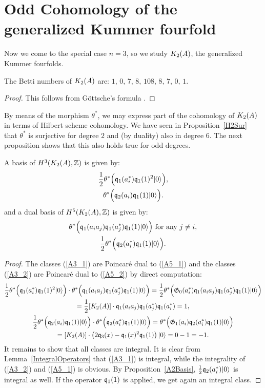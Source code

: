 \section{Odd Cohomology of the generalized Kummer fourfold}
Now we come to the special case $n=3$, so we study $\kum{A}{2}$, the generalized Kummer fourfolds.
\begin{proposition}
The Betti numbers of $\kum{A}{2}$ are:
$
1,\,0,\,7,\,8,\,108,\,8,\,7,\,0,\,1.
$
\end{proposition}
\begin{proof}
This follows from G\"ottsche's formula \cite[page 49]{Gottsche}.
\end{proof}

By means of the morphism $\theta^*$, we may express part of the cohomology of $\kum{A}{2}$ in terms of Hilbert scheme cohomology. We have seen in Proposition~\ref{H2Sur} that $\theta^*$ is surjective for degree $2$ and (by duality) also in degree $6$. 
The next proposition shows that this also holds true for odd degrees.
\begin{proposition}\label{oddcohomology}
A basis of $H^3(\X,\Z)$ is given by:
\begin{gather}
\label{A3_1}
\frac{1}{2}\theta^*\Big( \q_1(a^*_i)\q_1(1)^2\vac \Big), \\
\label{A3_2}
\theta^*\Big(\q_2(a_i)\q_1(1)\vac\Big).
\end{gather}
and a dual basis of $H^5(\X,\Z)$ is given by:
\begin{gather}
\label{A5_1}
 \theta^*\Big( \q_1(a_ia_j)\q_1(a_j^*)\q_1(1) \vac \Big) \ \text{for any } j\neq i, \\
\label{A5_2}
\frac{1}{2}\theta^*\Big( \q_2(a^*_i)\q_1(1)\vac \Big).
\end{gather}
\end{proposition}
\begin{proof}
The classes (\ref{A3_1}) are Poincar\'e dual to (\ref{A5_1}) and the classes (\ref{A3_2}) are Poincar\'e dual to (\ref{A5_2}) by direct computation:
\begin{gather*}
\frac{1}{2}\theta^*\Big( \q_1(a^*_i)\q_1(1)^2\vac \Big)\cdot \theta^*\Big( \q_1(a_ia_j)\q_1(a_j^*)\q_1(1) \vac \Big) = \frac{1}{2} \theta^*\Big(  \G_0(a^*_i) \q_1(a_ia_j)\q_1(a_j^*)\q_1(1) \vac \Big)\\
 =  \frac{1}{2}[\X]\cdot \q_1(a_ia_j)\q_1(a_j^*)\q_1(a_i^*) = 1, \\
 \frac{1}{2}\theta^*\Big(\q_2(a_i)\q_1(1)\vac\Big)\cdot \theta^*\Big( \q_2(a^*_i)\q_1(1)\vac \Big) =\theta^*\Big( \G_1(a_i)\q_2(a^*_i)\q_1(1)\vac  \Big) \\
 = [\X]\cdot \left( 2\q_3(x) - \q_1(x)^2\q_1(1) \right) \vac = 0-1=-1.
\end{gather*}
It remains to show that all classes are integral.
It is clear from Lemma~\ref{IntegralOperators} that (\ref{A3_1}) is integral, while the integrality of (\ref{A3_2}) and (\ref{A5_1}) is obvious. By Proposition~\ref{A2Basis}, $\frac{1}{2}\q_2(a^*_i)\vac$ is integral as well. If the operator $ \q_1(1)$ is applied, we get again an integral class.
\end{proof}
